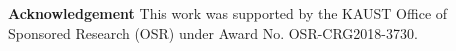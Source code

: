 \documentclass[10pt,twocolumn,letterpaper]{article}
\begin{document}
\textbf{Acknowledgement} This work was supported by the KAUST Office of Sponsored Research (OSR) under Award No. OSR-CRG2018-3730.


{\small


}
\clearpage
\end{document}
